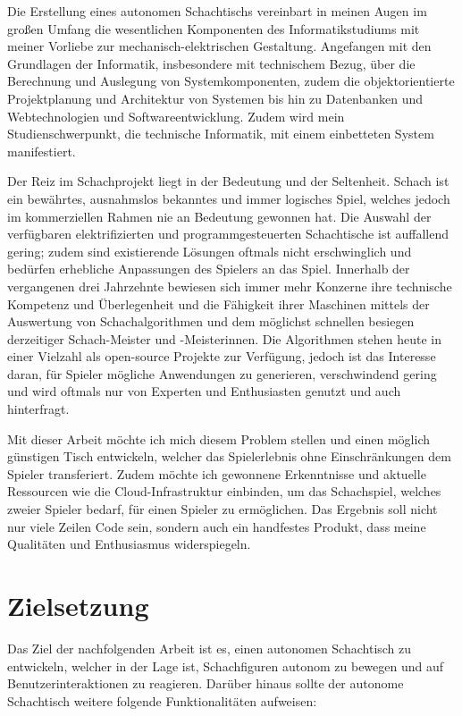 Die Erstellung eines autonomen Schachtischs vereinbart in meinen Augen
im großen Umfang die wesentlichen Komponenten des Informatikstudiums mit
meiner Vorliebe zur mechanisch-elektrischen Gestaltung. Angefangen mit
den Grundlagen der Informatik, insbesondere mit technischem Bezug, über
die Berechnung und Auslegung von Systemkomponenten, zudem die
objektorientierte Projektplanung und Architektur von Systemen bis hin zu
Datenbanken und Webtechnologien und Softwareentwicklung. Zudem wird mein
Studienschwerpunkt, die technische Informatik, mit einem einbetteten
System manifestiert.

Der Reiz im Schachprojekt liegt in der Bedeutung und der Seltenheit.
Schach ist ein bewährtes, ausnahmslos bekanntes und immer logisches
Spiel, welches jedoch im kommerziellen Rahmen nie an Bedeutung gewonnen
hat. Die Auswahl der verfügbaren elektrifizierten und
programmgesteuerten Schachtische ist auffallend gering; zudem sind
existierende Lösungen oftmals nicht erschwinglich und bedürfen
erhebliche Anpassungen des Spielers an das Spiel. Innerhalb der
vergangenen drei Jahrzehnte bewiesen sich immer mehr Konzerne ihre
technische Kompetenz und Überlegenheit und die Fähigkeit ihrer Maschinen
mittels der Auswertung von Schachalgorithmen und dem möglichst schnellen
besiegen derzeitiger Schach-Meister und -Meisterinnen. Die Algorithmen
stehen heute in einer Vielzahl als open-source Projekte zur Verfügung,
jedoch ist das Interesse daran, für Spieler mögliche Anwendungen zu
generieren, verschwindend gering und wird oftmals nur von Experten und
Enthusiasten genutzt und auch hinterfragt.

Mit dieser Arbeit möchte ich mich diesem Problem stellen und einen
möglich günstigen Tisch entwickeln, welcher das Spielerlebnis ohne
Einschränkungen dem Spieler transferiert. Zudem möchte ich gewonnene
Erkenntnisse und aktuelle Ressourcen wie die Cloud-Infrastruktur
einbinden, um das Schachspiel, welches zweier Spieler bedarf, für einen
Spieler zu ermöglichen. Das Ergebnis soll nicht nur viele Zeilen Code
sein, sondern auch ein handfestes Produkt, dass meine Qualitäten und
Enthusiasmus widerspiegeln.

\hypertarget{zielsetzung}{%
\section{Zielsetzung}\label{zielsetzung}}

Das Ziel der nachfolgenden Arbeit ist es, einen autonomen Schachtisch zu
entwickeln, welcher in der Lage ist, Schachfiguren autonom zu bewegen
und auf Benutzerinteraktionen zu reagieren. Darüber hinaus sollte der
autonome Schachtisch weitere folgende Funktionalitäten aufweisen:

